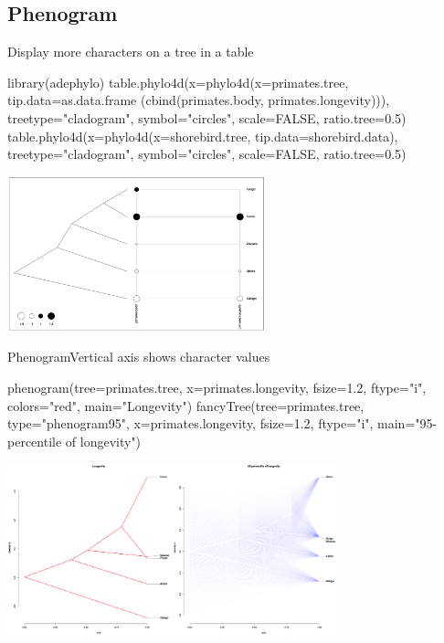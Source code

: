 \documentclass[compress, ucs, xelatex, 11pt, xcolor=svgnames,
  hyperref={
    bookmarks=true,
    unicode=true,
    colorlinks=true,
    pdftitle={Molecular data in R},
    plainpages=false,
    pdfauthor={Vojtech Zeisek},
    pdfsubject={Course about phylogeny and evolution in R},
    pdfcreator={XeLaTeX},
    pdfkeywords={R, evolution, phylogeny, molecular data},
    linkcolor=Tomato,
    anchorcolor=SaddleBrown,
    citecolor=Goldenrod,
    filecolor=DarkMagenta,
    menucolor=Sienna,
    urlcolor=DarkTurquoise,
    pdftex},
  url={hyphens, lowtilde} %
  ]{beamer}
\begin{document}
\subsection{Phenogram}

\begin{frame}[fragile]{Display more characters on a tree in a table}
  \begin{spluscode}
    library(adephylo)
    table.phylo4d(x=phylo4d(x=primates.tree, tip.data=as.data.frame
      (cbind(primates.body, primates.longevity))), treetype="cladogram",
      symbol="circles", scale=FALSE, ratio.tree=0.5)
    table.phylo4d(x=phylo4d(x=shorebird.tree, tip.data=shorebird.data),
      treetype="cladogram", symbol="circles", scale=FALSE, ratio.tree=0.5)
  \end{spluscode}
  \begin{center}
    \includegraphics[height=4.5cm]{phylotable.png}
  \end{center}
\end{frame}

\begin{frame}[fragile]{Phenogram}{Vertical axis shows character values}
  \begin{spluscode}
    phenogram(tree=primates.tree, x=primates.longevity, fsize=1.2,
      ftype="i", colors="red", main="Longevity")
    fancyTree(tree=primates.tree, type="phenogram95", x=primates.longevity,
      fsize=1.2, ftype="i", main="95-percentile of longevity")
  \end{spluscode}
  \begin{center}
    \includegraphics[height=5cm]{phenogram.png}
  \end{center}
\end{frame}
\end{document}
